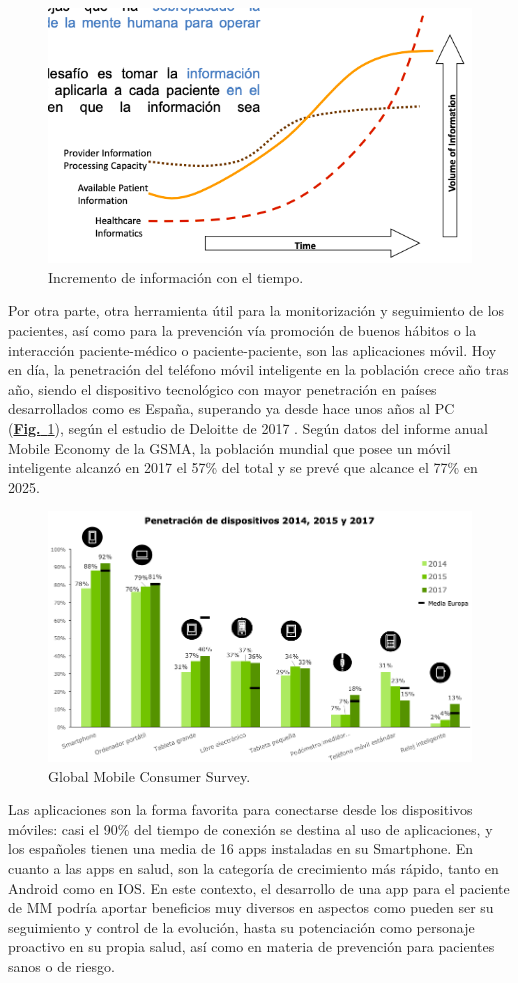 \documentclass{article}
\begin{document}
\begin{figure}[h]
\centering
\includegraphics[width = 0.8\linewidth]{../images/cap2.png}
\caption{Incremento de información con el tiempo.}
\end{figure}

Por otra parte, otra herramienta útil para la monitorización y
seguimiento de los pacientes, así como para la prevención vía
promoción de buenos hábitos o la interacción paciente-médico o
paciente-paciente, son las aplicaciones móvil. Hoy en día, la
penetración del teléfono móvil inteligente en la población crece año
tras año, siendo el dispositivo tecnológico con mayor penetración en
países desarrollados como es España, superando ya desde hace unos años
al PC (\hyperref[fig:cap]{\textbf{Fig.}~\ref*{fig:cap}}), según el estudio de Deloitte de 2017
\cite{deloitte2017}. Según datos del informe anual Mobile Economy de
la GSMA, la población mundial que posee un móvil inteligente alcanzó
en 2017 el 57\% del total y se prevé que alcance el 77\% en 2025.

\begin{figure}[h]
\centering
\includegraphics[width = 0.8\linewidth]{../images/cap1.png}
\caption{Global Mobile Consumer Survey.}
\label{fig:cap}
\end{figure}

Las aplicaciones son la forma favorita para conectarse desde los
dispositivos móviles: casi el 90\% del tiempo de conexión se destina al
uso de aplicaciones, y los españoles tienen una media de 16 apps
instaladas en su Smartphone. En cuanto a las apps en salud, son la
categoría de crecimiento más rápido, tanto en Android como en IOS. En
este contexto, el desarrollo de una app para el paciente de MM podría
aportar beneficios muy diversos en aspectos como pueden ser su
seguimiento y control de la evolución, hasta su potenciación como
personaje proactivo en su propia salud, así como en materia de
prevención para pacientes sanos o de riesgo.
\end{document}
